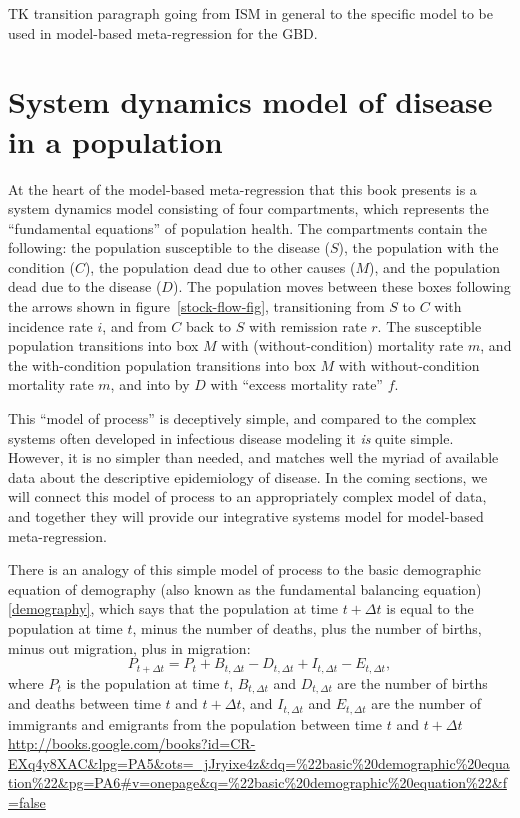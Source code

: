 TK transition paragraph going from ISM in general to the specific
model to be used in model-based meta-regression for the GBD.

\section{System dynamics model of disease in a population}
At the heart of the model-based meta-regression that this book
presents is a system dynamics model consisting of four
compartments, which represents the ``fundamental equations'' of population
health. The compartments contain the following: the population susceptible to the
disease ($S$), the population with the condition ($C$), the population
dead due to other causes ($M$), and the population dead due to the
disease ($D$). The population moves between these boxes following the
arrows shown in figure~\ref{stock-flow-fig}, transitioning from $S$ to $C$ with incidence
rate $i$, and from $C$ back to $S$ with remission rate $r$. The susceptible
population transitions into box $M$ with (without-condition) mortality
rate $m$, and the with-condition population transitions into box $M$ with
without-condition mortality rate $m$, and into by $D$ with ``excess
mortality rate'' $f$.

This ``model of process'' is deceptively simple, and compared to the
 complex systems often developed in infectious disease modeling
 it \emph{is} quite simple.  However, it is no simpler than needed,
 and matches well the myriad of available data about the descriptive
 epidemiology of disease.  In the coming sections, we will connect this
 model of process to an appropriately complex model of data, and
 together they will provide our integrative systems model for
 model-based meta-regression.

There is an analogy of this simple model of process to the
 basic demographic equation of demography (also known as the
 fundamental balancing equation) \ref{demography}, which says that the population at
 time $t+\Delta t$ is equal to the population at time $t$, minus the
 number of deaths, plus the number of births, minus out migration,
 plus in migration:
\[P_{t+\Delta t} = P_t + B_{t, \Delta t} - D_{t, \Delta t} +
 I_{t, \Delta t} - E_{t, \Delta t},
\]
where $P_t$ is the population at time $t$, $B_{t, \Delta t}$ and
 $D_{t, \Delta t}$ are the
 number of births and deaths between time $t$ and $t+\Delta t$, and
 $I_{t, \Delta t}$ and $E_{t, \Delta t}$ are the number of immigrants
 and emigrants from the population between time $t$ and $t+\Delta t$
 \url{http://books.google.com/books?id=CR-EXq4y8XAC&lpg=PA5&ots=_jJryixe4z&dq=%22basic%20demographic%20equation%22&pg=PA6#v=onepage&q=%22basic%20demographic%20equation%22&f=false}

